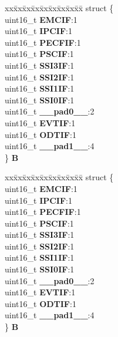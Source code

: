 \begin{DoxyCompactItemize}
\begin{tabbing}
\end{tabbing}\item 
\mbox{\label{unionuPIFR1_afd40672018b2fc3729ff1a99a7c18d7d}} 
\begin{tabbing}
xx\=xx\=xx\=xx\=xx\=xx\=xx\=xx\=xx\=\kill
struct \{\\
\>uint16\_t {\bfseries EMCIF}:1\\
\>uint16\_t {\bfseries IPCIF}:1\\
\>uint16\_t {\bfseries PECFIF}:1\\
\>uint16\_t {\bfseries PSCIF}:1\\
\>uint16\_t {\bfseries SSI3IF}:1\\
\>uint16\_t {\bfseries SSI2IF}:1\\
\>uint16\_t {\bfseries SSI1IF}:1\\
\>uint16\_t {\bfseries SSI0IF}:1\\
\>uint16\_t {\bfseries \_\_pad0\_\_}:2\\
\>uint16\_t {\bfseries EVTIF}:1\\
\>uint16\_t {\bfseries ODTIF}:1\\
\>uint16\_t {\bfseries \_\_pad1\_\_}:4\\
\} {\bfseries B}\\

\end{tabbing}\item 
\mbox{\label{unionuPIFR1_abc7ed1ad2ee30022fbdca89062c7b204}} 
\begin{tabbing}
xx\=xx\=xx\=xx\=xx\=xx\=xx\=xx\=xx\=\kill
struct \{\\
\>uint16\_t {\bfseries EMCIF}:1\\
\>uint16\_t {\bfseries IPCIF}:1\\
\>uint16\_t {\bfseries PECFIF}:1\\
\>uint16\_t {\bfseries PSCIF}:1\\
\>uint16\_t {\bfseries SSI3IF}:1\\
\>uint16\_t {\bfseries SSI2IF}:1\\
\>uint16\_t {\bfseries SSI1IF}:1\\
\>uint16\_t {\bfseries SSI0IF}:1\\
\>uint16\_t {\bfseries \_\_pad0\_\_}:2\\
\>uint16\_t {\bfseries EVTIF}:1\\
\>uint16\_t {\bfseries ODTIF}:1\\
\>uint16\_t {\bfseries \_\_pad1\_\_}:4\\
\} {\bfseries B}\\


\end{tabbing}
\end{DoxyCompactItemize}

